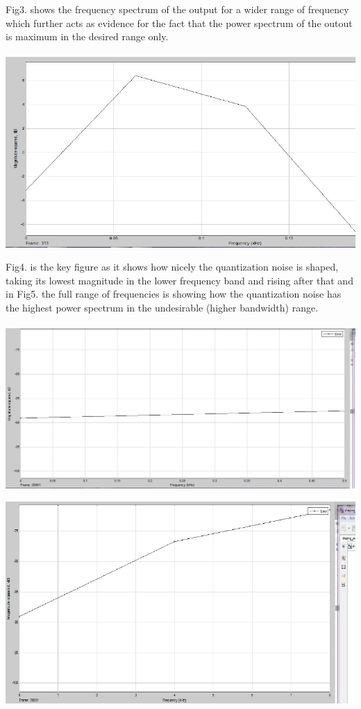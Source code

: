\documentclass[colorlinks=true,pdfstartview=FitV,linkcolor=blue,
            citecolor=red,urlcolor=magenta]{ligodoc}
\begin{document}
Fig3. shows the frequency spectrum of the output for a wider range of frequency which further acts as evidence for the fact that the power spectrum of the outout is maximum in the desired range only. \\ \\ \includegraphics[scale=0.5]{Output_Spectrum_Full_Range}

Fig4. is the key figure as it shows how nicely the quantization noise is shaped, taking its lowest magnitude in the lower frequency band and rising after that and in Fig5. the full range of frequencies is showing how the quantization noise has the highest power spectrum in the undesirable (higher bandwidth) range. \\ \\ 
\includegraphics[scale=0.5]{Error_Frequency_Spectrum_Low_Range}

\includegraphics[scale=0.5]{Error_Frequency_Spectrum_Full_Range}
\end{document}
